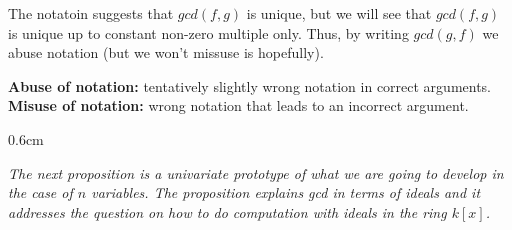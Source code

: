 The notatoin suggests that $gcd(f,g)$ is unique, but we will see that $gcd(f,g)$ is unique up to constant non-zero multiple only. Thus, by writing $gcd(g,f)$ we abuse 
notation (but we won't missuse is hopefully).

\clearpage 

\begin{tcolorbox}[sharp corners, title = In Math:, colback = airforceblue!5!white, colframe = airforceblue!95!black, fonttitle = \bfseries]
   \textbf{Abuse of notation:} tentatively slightly wrong notation in correct arguments. \\

   \textbf{Misuse of notation:} wrong notation that leads to an incorrect argument.
\end{tcolorbox}

\begin{addmargin}[0.6cm]{0.6cm}  
\begin{center}
        \textit{\textcolor{airforceblue}{The next proposition is a univariate prototype of what we are going to develop in the case of $n$ variables. The proposition explains gcd in terms of ideals and it 
        addresses the question on how to do computation with ideals in the ring $k[x]$.}}
    \end{center}
\end{addmargin}

